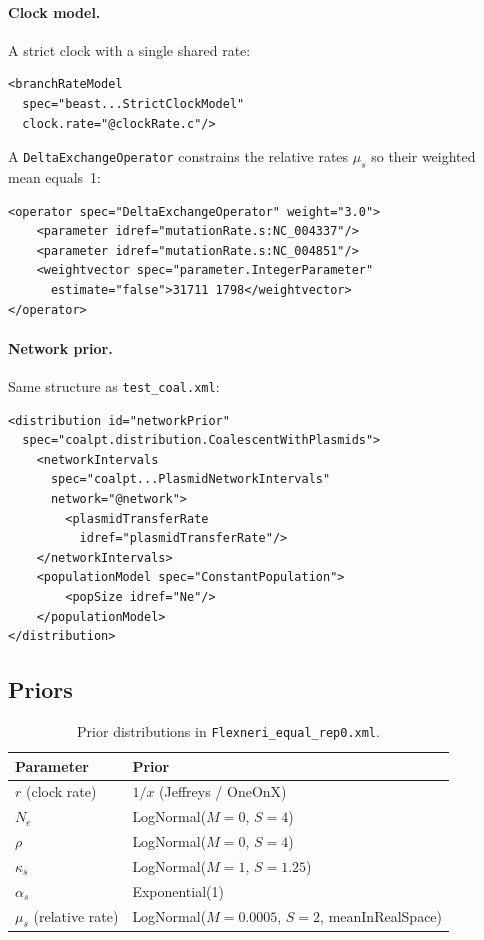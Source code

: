 \documentclass[11pt]{article}
\begin{document}
\bigskip
\noindent\begin{minipage}{\linewidth}
\paragraph{Clock model.} A strict clock with a single shared rate:
\begin{lstlisting}
<branchRateModel
  spec="beast...StrictClockModel"
  clock.rate="@clockRate.c"/>
\end{lstlisting}
A \texttt{DeltaExchangeOperator} constrains the relative rates $\mu_s$ so their weighted mean equals~1:
\begin{lstlisting}
<operator spec="DeltaExchangeOperator" weight="3.0">
    <parameter idref="mutationRate.s:NC_004337"/>
    <parameter idref="mutationRate.s:NC_004851"/>
    <weightvector spec="parameter.IntegerParameter"
      estimate="false">31711 1798</weightvector>
</operator>
\end{lstlisting}
\end{minipage}

\bigskip
\noindent\begin{minipage}{\linewidth}
\paragraph{Network prior.} Same structure as \texttt{test\_coal.xml}:
\begin{lstlisting}
<distribution id="networkPrior"
  spec="coalpt.distribution.CoalescentWithPlasmids">
    <networkIntervals
      spec="coalpt...PlasmidNetworkIntervals"
      network="@network">
        <plasmidTransferRate
          idref="plasmidTransferRate"/>
    </networkIntervals>
    <populationModel spec="ConstantPopulation">
        <popSize idref="Ne"/>
    </populationModel>
</distribution>
\end{lstlisting}
\end{minipage}

\subsection{Priors}

\begin{table}[H]
\centering
\begin{tabular}{@{} l l @{}}
\toprule
\textbf{Parameter} & \textbf{Prior} \\
\midrule
$r$ (clock rate) & $1/x$ (Jeffreys / OneOnX) \\
$N_e$ & LogNormal($M=0$, $S=4$) \\
$\rho$ & LogNormal($M=0$, $S=4$) \\
$\kappa_s$ & LogNormal($M=1$, $S=1.25$) \\
$\alpha_s$ & Exponential(1) \\
$\mu_s$ (relative rate) & LogNormal($M=0.0005$, $S=2$, meanInRealSpace) \\
\bottomrule
\end{tabular}
\caption{Prior distributions in \texttt{Flexneri\_equal\_rep0.xml}.}
\end{table}
\end{document}
